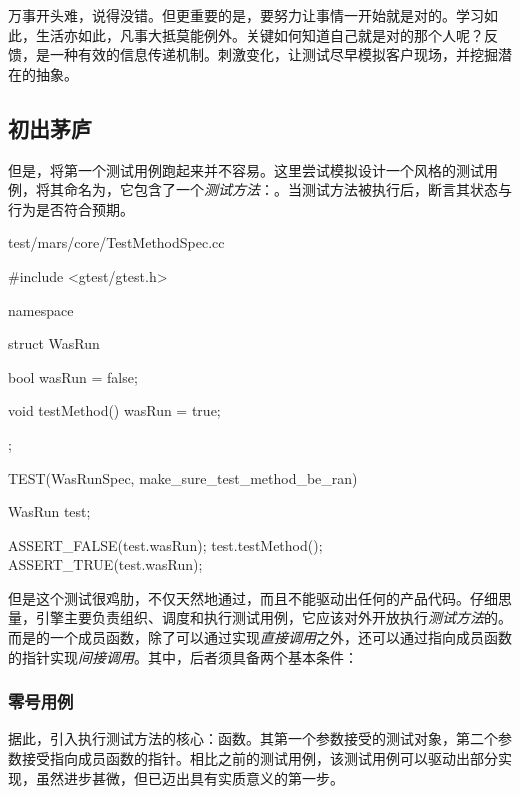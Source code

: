 \begin{content}

万事开头难，说得没错。但更重要的是，要努力让事情一开始就是对的。学习如此，生活亦如此，凡事大抵莫能例外。关键如何知道自己就是对的那个人呢？反馈，是一种有效的信息传递机制。刺激变化，让测试尽早模拟客户现场，并挖掘潜在的抽象。

\subsection{初出茅庐}

但是，将第一个测试用例跑起来并不容易。这里尝试模拟设计一个风格的测试用例，将其命名为，它包含了一个\emph{测试方法}：。当测试方法被执行后，断言其状态与行为是否符合预期。

\begin{nodiff}{test/mars/core/TestMethodSpec.cc}
\begin{c++}
#include <gtest/gtest.h>

namespace {
  struct WasRun {
    bool wasRun = false;

    void testMethod() {
      wasRun = true;
    }
  };
}

TEST(WasRunSpec, make_sure_test_method_be_ran) {
  WasRun test;

  ASSERT_FALSE(test.wasRun);
  test.testMethod();
  ASSERT_TRUE(test.wasRun);
}
\end{c++}
\end{nodiff}

但是这个测试很鸡肋，不仅天然地通过，而且不能驱动出任何的产品代码。仔细思量，引擎主要负责组织、调度和执行测试用例，它应该对外开放执行\emph{测试方法}的。而是的一个成员函数，除了可以通过实现\emph{直接调用}之外，还可以通过指向成员函数的指针实现\emph{间接调用}。其中，后者须具备两个基本条件：

\begin{enum}
\end{enum}

\subsubsection{零号用例}

据此，引入执行测试方法的核心：函数。其第一个参数接受的测试对象，第二个参数接受指向成员函数的指针。相比之前的测试用例，该测试用例可以驱动出部分实现，虽然进步甚微，但已迈出具有实质意义的第一步。


\end{content}
